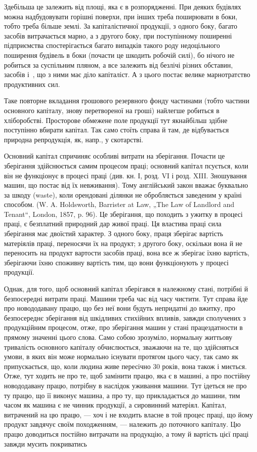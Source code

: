 
Здебільша це залежить від площі, яка є в розпорядженні. При деяких будівлях можна надбудовувати
горішні поверхи, при інших треба поширювати в боки, тобто треба більше землі. За капіталістичної
продукції, з одного боку, багато засобів витрачається марно, а з другого боку, при поступінному
поширенні підприємства спостерігається багато випадків такого роду недоцільного поширення будівель в
боки (почасти це шкодить робочій силі), бо нічого не робиться за суспільним пляном, а все залежить
від безлічі різних обставин, засобів і~, що з ними має діло капіталіст. А з цього постає
велике марнотратство продуктивних сил.

Таке повторне вкладання грошового резервного фонду частинами (тобто частини основного капіталу,
знову перетвореної на гроші) найлегше робиться в хліборобстві. Просторове обмежене поле продукції
тут якнайбільш здібне поступінно вбирати капітал. Так само стоїть справа й там, де відбувається
природна репродукція, як, напр., у скотарстві.

Основний капітал спричиняє особливі витрати на зберігання. Почасти це зберігання здійснюється самим
процесом праці; основний капітал псується, коли він не функціонує в процесі праці (див. кн. І, розд.
VI і розд. XIII. Зношування машин, що постає від їх невживання). Тому англійський закон вважає
буквально за шкоду (waste), коли орендовані ділянки не обробляється заведеним у країні способом. (W.
A. Holdsworth, Barrister at Law, „The Law of Landlord and Tenant“, London, 1857, p. 96). Це
зберігання, що походить з ужитку в процесі праці, є безплатний природний дар живої праці. Ця
властива праці сила зберігання має двоїстий характер. З одного боку, праця зберігає вартість
матеріялів праці, переносячи їх на продукт; з другого боку, оскільки вона й не переносить на продукт
вартости засобів праці, вона все ж зберігає їхню вартість, зберігаючи їхню споживну вартість тим, що
вони функціонують у процесі продукції.

Однак, для того, щоб основний капітал зберігався в належному стані, потрібні й безпосередні витрати
праці. Машини треба час від часу чистити. Тут справа йде про новододавану працю, що без неї вони
будуть непридатні до вжитку, про безпосереднє зберігання від шкідливих стихійних впливів, завжди
сполучених з продукційним процесом, отже, про зберігання машин у стані працездатности в прямому
значенні цього слова. Само собою зрозуміло, нормальну життьову тривалість основного капіталу
обчислюється, зважаючи на те, що здійсняться умови, в яких він може нормально існувати протягом
цього часу, так само як припускається, що, коли людина живе пересічно 30 років, вона також і
миється. Отже, тут ходить не про те, щоб замінити працю, яка є в машині, а про постійну новододавану
працю, потрібну в наслідок уживання машини. Тут ідеться не про ту працю, що її виконує машина, а про
ту, що прикладається до машини, тим часом як машина є не чинник продукції, а сировинний
матеріял. Капітал, витрачений на цю працю, — хоч і не входить власне в той процес праці, що йому
продукт завдячує своїм походженням, — належить до поточного капіталу. Цю працю доводиться постійно
витрачати на продукцію, а тому й вартість цієї праці завжди мусить покриватись
\parbreak{}  %
